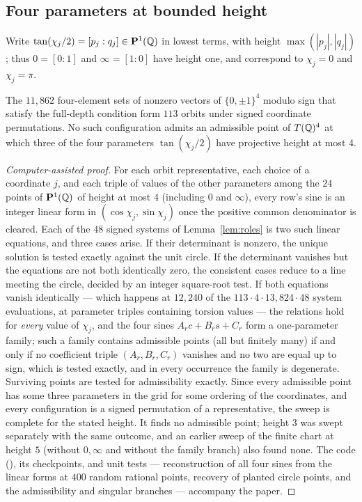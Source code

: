 \subsection{Four parameters at bounded height}

Write $\tan(\chi_j/2)=[p_j:q_j]\in\mathbf P^1(\mathbb Q)$ in lowest terms, with height $\max(|p_j|,|q_j|)$; thus $0=[0:1]$ and
$\infty=[1:0]$ have height one, and correspond to $\chi_j=0$ and $\chi_j=\pi$.

\begin{proposition}\label{prop:four}
The $11{,}862$ four-element sets of nonzero vectors of $\{0,\pm1\}^4$ modulo sign that satisfy the full-depth condition
form $113$ orbits under signed coordinate permutations. No such configuration admits an admissible point of $T(\mathbb Q)^4$ at
which three of the four parameters $\tan(\chi_j/2)$ have projective height at most $4$.
\end{proposition}

\begin{proof}[Computer-assisted proof]
For each orbit representative, each choice of a coordinate $j$, and each triple of values of the other parameters among the
$24$ points of $\mathbf P^1(\mathbb Q)$ of height at most $4$ (including $0$ and $\infty$), every row's sine is an integer linear form in
$(\cos\chi_j,\sin\chi_j)$ once the positive common denominator is cleared. Each of the $48$ signed systems of
Lemma~\ref{lem:roles} is two such linear equations, and three cases arise. If their determinant is nonzero, the unique
solution is tested exactly against the unit circle. If the determinant vanishes but the equations are not both identically
zero, the consistent cases reduce to a line meeting the circle, decided by an integer square-root test. If both equations
vanish identically — which happens at $12{,}240$ of the $113\cdot4\cdot13{,}824\cdot48$ system evaluations, at parameter
triples containing torsion values — the relations hold for \emph{every} value of $\chi_j$, and the four sines
$A_rc+B_rs+C_r$ form a one-parameter family; such a family contains admissible points (all but finitely many) if and only if
no coefficient triple $(A_r,B_r,C_r)$ vanishes and no two are equal up to sign, which is tested exactly, and in every
occurrence the family is degenerate. Surviving points are tested for admissibility exactly. Since every admissible point has
some three parameters in the grid for some ordering of the coordinates, and every configuration is a signed permutation of a
representative, the sweep is complete for the stated height. It finds no admissible point; height $3$ was swept separately
with the same outcome, and an earlier sweep of the finite chart at height $5$ (without $0,\infty$ and without the family
branch) also found none. The code (), its checkpoints, and unit tests —
reconstruction of all four sines from the linear forms at $400$ random rational points, recovery of planted circle points,
and the admissibility and singular branches — accompany the paper.
\end{proof}

